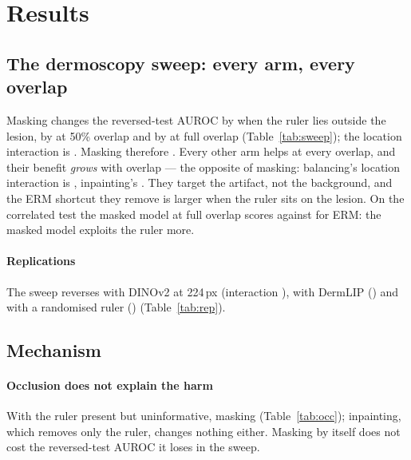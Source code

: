 \section{Results}
\subsection{The dermoscopy sweep: every arm, every overlap}
Masking changes the reversed-test AUROC by \sTwoMaskZero{} when the ruler lies outside the lesion, by
\sTwoMaskFiveZero{} at 50\% overlap and by \sTwoMaskOneZeroZero{} at full overlap (Table~\ref{tab:sweep}); the location
interaction is \sTwoInter. Masking therefore \sTwoHarmVerdict. Every other arm helps at every overlap, and their
benefit \emph{grows} with overlap --- the opposite of masking: balancing's location interaction is \sTwoDermBalInter,
inpainting's \sTwoDermInpInter. They target the artifact, not the background, and the ERM shortcut they remove is
larger when the ruler sits on the lesion. On the correlated test the masked model at full overlap scores
\sTwoCorrMaskHundred{} against \sTwoCorrErmHundred{} for ERM: the masked model exploits the ruler more.

\paragraph{Replications} The sweep reverses with DINOv2 at 224\,px (interaction \sTwoDinoTwoTwoFourInter), with DermLIP
(\sTwoDermlipInter) and with a randomised ruler (\sTwoStressInter) (Table~\ref{tab:rep}).


\subsection{Mechanism}
\paragraph{Occlusion does not explain the harm} With the ruler present but uninformative, masking \sTwoOccVerdict{}
(Table~\ref{tab:occ}); inpainting, which removes only the ruler, changes nothing either. Masking by itself does not cost
the reversed-test AUROC it loses in the sweep.


